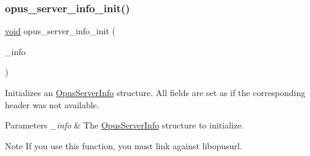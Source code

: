 \subsubsection{\texorpdfstring{opus\_server\_info\_init()}{opus\_server\_info\_init()}}
{\footnotesize\ttfamily \mbox{\hyperlink{_s_d_l__opengles2__gl2ext_8h_ae5d8fa23ad07c48bb609509eae494c95}{void}} opus\+\_\+server\+\_\+info\+\_\+init (\begin{DoxyParamCaption}\item[{\mbox{\hyperlink{struct_opus_server_info}{Opus\+Server\+Info}} $\ast$}]{\+\_\+info }\end{DoxyParamCaption})}

Initializes an \mbox{\hyperlink{struct_opus_server_info}{Opus\+Server\+Info}} structure. All fields are set as if the corresponding header was not available. 
\begin{DoxyParams}{Parameters}
{\em \+\_\+info} & The \mbox{\hyperlink{struct_opus_server_info}{Opus\+Server\+Info}} structure to initialize. \\
\hline
\end{DoxyParams}
\begin{DoxyNote}{Note}
If you use this function, you must link against {\ttfamily libopusurl}. 
\end{DoxyNote}
